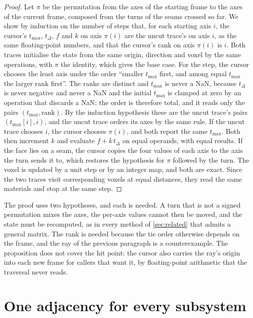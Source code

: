 \documentclass[10pt,a4paper]{article}
\newcommand{\tmax}{t_{\max}}
\newcommand{\tdelta}{t_{\Delta}}
\begin{document}
\begin{proof}
Let $\pi$ be the permutation from the axes of the starting frame to the axes of the current
frame, composed from the turns of the seams crossed so far. We show by induction on the number
of steps that, for each starting axis $i$, the cursor's $\tmax$, $\tdelta$, $f$ and $k$ on axis
$\pi(i)$ are the uncut trace's on axis $i$, as the same floating-point numbers, and that the
cursor's rank on axis $\pi(i)$ is $i$. Both traces initialise the state from the same origin,
direction and voxel by the same operations, with $\pi$ the identity, which gives the base case.
For the step, the cursor chooses the least axis under the order ``smaller $\tmax$ first, and
among equal $\tmax$ the larger rank first''. The ranks are distinct and $\tmax$ is never a NaN,
because $\tdelta$ is never negative and never a NaN and the initial $\tmax$ is clamped at zero by an
operation that discards a NaN; the order is therefore total, and it reads only the pairs
$(\tmax, \text{rank})$. By the induction hypothesis these are the uncut trace's pairs
$(\tmax[i], i)$, and the uncut trace orders its axes by the same rule. If the uncut trace
chooses $i$, the cursor chooses $\pi(i)$, and both report the same $\tmax$. Both then
increment $k$ and evaluate $f + k\,\tdelta$ on equal operands, with equal results. If the face
lies on a seam, the cursor copies the four values of each axis to the axis the turn sends it to,
which restores the hypothesis for $\pi$ followed by the turn. The voxel is updated by a unit
step or by an integer map, and both are exact. Since the two traces visit corresponding voxels
at equal distances, they read the same materials and stop at the same step.
\end{proof}

The proof uses two hypotheses, and each is needed. A turn that is not a signed permutation mixes
the axes, the per-axis values cannot then be moved, and the state must be recomputed, as in every
method of \cref{sec:related} that admits a general matrix. The rank is needed because the tie
order otherwise depends on the frame, and the ray of the previous paragraph is a counterexample. The proposition does not cover
the hit point: the cursor also carries the ray's origin into each new frame for callers that
want it, by floating-point arithmetic that the traversal never reads.

\section{One adjacency for every subsystem}
\label{sec:subsystems}
\end{document}
